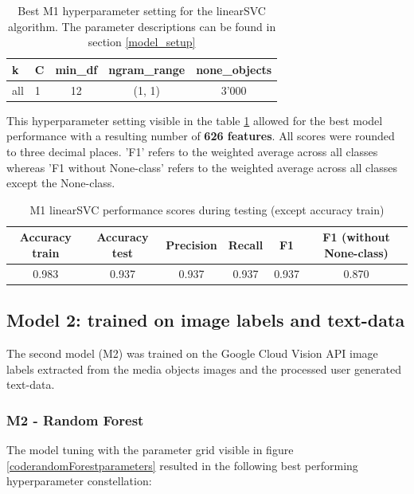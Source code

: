 \begin{table}[h!]
\begin{center}
\caption{Best M1 hyperparameter setting for the linearSVC algorithm. The parameter descriptions can be found in section \ref{model_setup}}\vspace{1ex}
\label{tab:m1_linearSVC_bestParams}
\begin{tabular}{llccc}\hline
k & C & min\_df & ngram\_range & none\_objects \\ \hline
all & 1 & 12 & (1, 1) & 3'000 \\ \hline
\end{tabular}
\end{center}
\end{table}

This hyperparameter setting visible in the table \ref{tab:m1_linearSVC_bestParams} allowed for the best model performance with a resulting number of \textbf{626 features}. All scores were rounded to three decimal places. 'F1' refers to the weighted average across all classes whereas 'F1 without None-class' refers to the weighted average across all classes except the None-class.

\begin{table}[h!]
\begin{center}
\caption{M1 linearSVC performance scores during testing (except accuracy train)}\vspace{1ex}
\label{tab:m1_linearSVC_bestscores}
\begin{tabular}{cccccc}\hline
Accuracy train & Accuracy test & Precision & Recall & F1 & F1 (without None-class)\\ \hline
0.983 & 0.937 & 0.937 & 0.937 & 0.937 & 0.870 \\ \hline
\end{tabular}
\end{center}
\end{table}

\subsection{Model 2: trained on image labels and text-data}
The second model (M2) was trained on the Google Cloud Vision API image labels extracted from the media objects images and the processed user generated text-data.

\subsubsection{M2 - Random Forest}
The model tuning with the parameter grid visible in figure \ref{coderandomForestparameters} resulted in the following best performing hyperparameter constellation:\\

